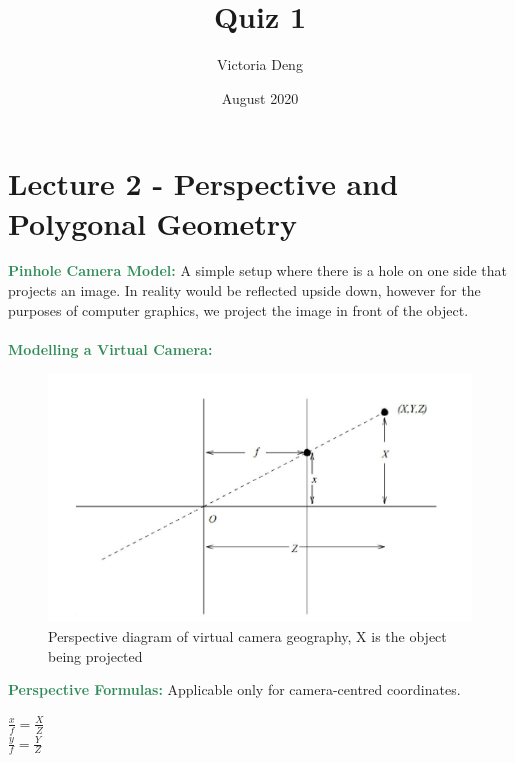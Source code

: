 \documentclass[a4paper,10pt]{article}
\title{Quiz 1 }
\author {Victoria Deng}
\date{\small August 2020}
\begin{document}
\maketitle

\section*{Lecture 2 - Perspective and Polygonal Geometry}
\textcolor{SeaGreen}{\textbf{Pinhole Camera Model:}} A simple setup where there is a hole on one side that projects an image. In reality would be reflected upside down, however for the purposes of computer graphics, we project the image in front of the object. 
\\ \\
\textcolor{SeaGreen}{\textbf{Modelling a Virtual Camera:}} \\ 
\begin{figure}[htbp]
\centerline{ \includegraphics[scale = 0.5]{projimage}}
\caption{Perspective diagram of virtual camera geography, X is the object being projected }
\label{fig}
\end{figure}

\noindent \textcolor{SeaGreen}{\textbf{Perspective Formulas:}}  Applicable only for camera-centred coordinates. \\ 
\begin{center} 
$\frac{x}{f} = \frac{X}{Z} $ \\ 
$\frac{y}{f} = \frac{Y}{Z} $ \\ 
\end{center}
\end{document}
